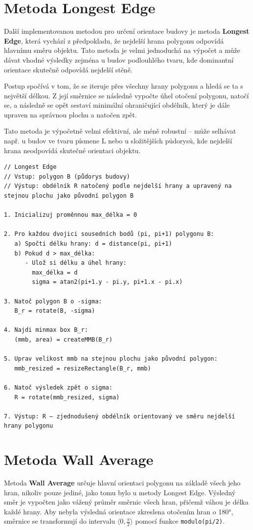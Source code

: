 \documentclass[a4paper,12pt]{article}
\begin{document}
\section{Metoda Longest Edge}
Další implementovanou metodou pro určení orientace budovy je metoda \textbf{Longest Edge}, která vychází z předpokladu, že nejdelší hrana polygonu odpovídá hlavnímu směru objektu. Tato metoda je velmi jednoduchá na výpočet a může dávat vhodné výsledky zejména u budov podlouhlého tvaru, kde dominantní orientace skutečně odpovídá nejdelší stěně.

Postup spočívá v tom, že se iteruje přes všechny hrany polygonu a hledá se ta s největší délkou. Z její směrnice se následně vypočte úhel otočení polygonu, natočí se, a následně se opět sestaví minimální ohraničující obdélník, který je dále upraven na správnou plochu a natočen zpět.

Tato metoda je výpočetně velmi efektivní, ale méně robustní – může selhávat např. u budov ve tvaru písmene L nebo u složitějších půdorysů, kde nejdelší hrana neodpovídá skutečné orientaci objektu.

\begin{verbatim}
// Longest Edge
// Vstup: polygon B (půdorys budovy)
// Výstup: obdélník R natočený podle nejdelší hrany a upravený na stejnou plochu jako původní polygon B

1. Inicializuj proměnnou max_délka = 0

2. Pro každou dvojici sousedních bodů (pi, pi+1) polygonu B:
   a) Spočti délku hrany: d = distance(pi, pi+1)
   b) Pokud d > max_délka:
      - Ulož si délku a úhel hrany:
        max_délka = d
        sigma = atan2(pi+1.y - pi.y, pi+1.x - pi.x)

3. Natoč polygon B o -sigma:
   B_r = rotate(B, -sigma)

4. Najdi minmax box B_r:
   (mmb, area) = createMMB(B_r)

5. Uprav velikost mmb na stejnou plochu jako původní polygon:
   mmb_resized = resizeRectangle(B_r, mmb)

6. Natoč výsledek zpět o sigma:
   R = rotate(mmb_resized, sigma)

7. Výstup: R – zjednodušený obdélník orientovaný ve směru nejdelší hrany polygonu
\end{verbatim}

\section{Metoda Wall Average}
Metoda \textbf{Wall Average} určuje hlavní orientaci polygonu na základě všech jeho hran, nikoliv pouze jediné, jako tomu bylo u metody Longest Edge. Výsledný směr je vypočten jako vážený průměr směrnic všech hran, přičemž váhou je délka každé hrany. Aby nebyla výsledná orientace zkreslena otočením hran o 180°, směrnice se transformují do intervalu \( \langle 0, \frac{\pi}{2} \rangle \) pomocí funkce \verb|modulo(pi/2)|.
\end{document}
